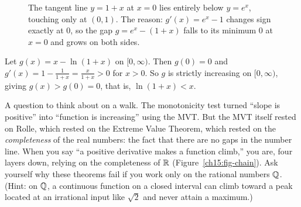 \begin{figure}[H]
\centering
{}
\caption{The tangent line $y=1+x$ at $x=0$ lies entirely below $y=e^x$, touching
only at $(0,1)$. The reason: $g'(x)=e^x-1$ changes sign exactly at $0$, so
the gap $g=e^x-(1+x)$ falls to its minimum $0$ at $x=0$ and grows on both
sides.}
\label{ch15:fig-exp-ineq}
\end{figure}

\begin{example}[$\ln(1+x)<x$ for $x>0$]\label{ch15:ex-log-ineq}
Let $g(x)=x-\ln(1+x)$ on $[0,\infty)$. Then $g(0)=0$ and
$g'(x)=1-\frac{1}{1+x}=\frac{x}{1+x}>0$ for $x>0$. So $g$ is strictly increasing on
$[0,\infty)$, giving $g(x)>g(0)=0$, that is, $\ln(1+x)<x$.
\end{example}

\begin{walkbox}
A question to think about on a walk. The monotonicity test
turned ``slope is positive'' into ``function is increasing'' using the MVT. But the
MVT itself rested on Rolle, which rested on the Extreme Value Theorem, which rested
on the \emph{completeness} of the real numbers: the fact that there are no gaps in
the number line. When you say ``a positive derivative makes a function climb,''
you are, four layers down, relying on the completeness of $\mathbb{R}$
(Figure~\ref{ch15:fig-chain}).
Ask yourself why these theorems fail if you work only on the rational numbers $\mathbb{Q}$.
(Hint: on $\mathbb{Q}$, a continuous function on a closed interval can climb toward a peak
located at an irrational input like $\sqrt{2}$ and never attain a maximum.)
\end{walkbox}

